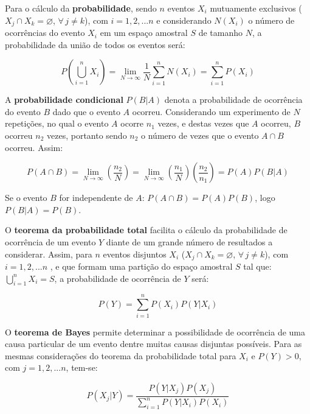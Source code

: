 Para o cálculo da \textbf{probabilidade}, sendo $n$ eventos $X_i$ mutuamente exclusivos ($X_j \cap X_k = \varnothing$, $\forall \, j \neq k$), com $i = 1, 2, ... n$ e considerando $N(X_i)$ o número de ocorrências do evento $X_i$ em um espaço amostral $S$ de tamanho $N$, a probabilidade da união de todos os eventos será:

\begin{equation} \label{lathi:1}
P\left(\bigcup_{i=1}^{n}X_i \right) = \lim_{N\to\infty} \frac{1}{N}\sum_{i=1}^{n} N(X_i) = \sum_{i=1}^{n} P(X_i)
\end{equation}

A \textbf{probabilidade condicional} $P(B|A)$ denota a probabilidade de ocorrência do evento $B$ dado que o evento $A$ ocorreu. Considerando um experimento de $N$ repetições, no qual o evento $A$ ocorre $n_1$ vezes, e destas vezes que $A$ ocorreu, $B$ ocorreu $n_2$ vezes, portanto sendo $n_2$ o número de vezes que o evento $A \cap B$ ocorreu. Assim:

\begin{equation} \label{lathi:2}
P(A \cap B) = \lim_{N\to\infty} \left(\frac{n_2}{N}\right) = \lim_{N\to\infty} \left(\frac{n_1}{N}\right) \left(\frac{n_2}{n_1}\right) = P(A)P(B|A) 
\end{equation}

Se o evento $B$ for independente de $A$: $P(A \cap B) = P(A)P(B)$, logo $P(B|A)=P(B)$.

O \textbf{teorema da probabilidade total} facilita o cálculo da probabilidade de ocorrência de um evento $Y$ diante de um grande número de resultados a considerar. Assim, para $n$ eventos disjuntos $X_i$ ($X_j \cap X_k = \varnothing$, $\forall \, j \neq k$), com $i = 1, 2, ... n$ , e que formam uma partição do espaço amostral $S$ tal que: $\bigcup_{i=1}^{n}X_i = S$, a probabilidade de ocorrência de $Y$ será:

\begin{equation} \label{lathi:3}
P(Y) = \sum_{i=1}^{n} P(X_i)P(Y|X_i) 
\end{equation}

O \textbf{teorema de Bayes} permite determinar a possibilidade de ocorrência de uma causa particular de um evento dentre muitas causas disjuntas possíveis. Para as mesmas considerações do teorema da probabilidade total para $X_i$ e $P(Y)>0$, com $j = 1, 2, ... n$, tem-se:

\begin{equation} \label{lathi:4}
P(X_j|Y) = \frac{P(Y|X_j)P(X_j)}{\sum_{i=1}^{n} P(Y|X_i)P(X_i)} 
\end{equation}

